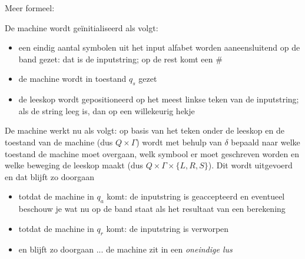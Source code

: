 Meer formeel:


De machine wordt ge\"{i}nitialiseerd als volgt:
\begin{itemize}
\item een eindig aantal symbolen uit het input alfabet worden
aaneensluitend op de band gezet: dat is de inputstring; op de rest
komt een \#
\item de machine wordt in toestand $q_s$ gezet
\item de leeskop wordt gepositioneerd op het meest linkse teken van de
inputstring; als de string leeg is, dan op een willekeurig hekje
\end{itemize}


De machine werkt nu als volgt: op basis van het teken onder de
leeskop en de toestand van de machine (dus $Q \times \Gamma$) wordt
met behulp van $\delta$ bepaald naar welke toestand de machine moet
overgaan, welk symbool er moet geschreven worden en welke beweging de
leeskop maakt (dus $Q \times \Gamma \times \{L,R,S\}$). Dit wordt
uitgevoerd en dat blijft zo doorgaan 
\begin{itemize}
\item totdat de machine in $q_a$ komt: de inputstring is geaccepteerd
en eventueel beschouw je wat nu op de band staat als het resultaat
van een berekening
\item totdat de machine in $q_r$ komt: de inputstring is verworpen
\item en blijft zo doorgaan ... de machine zit in een {\em oneindige
lus}
\end{itemize}

